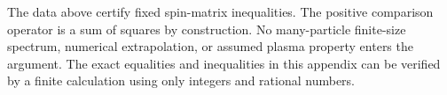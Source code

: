 \begin{remark}
The data above certify fixed spin-matrix inequalities. The positive comparison operator is a sum of squares by construction. No many-particle finite-size spectrum, numerical extrapolation, or assumed plasma property enters the argument. The exact equalities and inequalities in this appendix can be verified by a finite calculation using only integers and rational numbers.
\end{remark}
